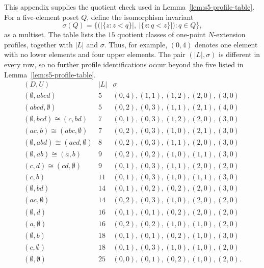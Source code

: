 This appendix supplies the quotient check used in
Lemma~\ref{lem:s5-profile-table}.  For a five-element poset $Q$, define
the isomorphism invariant
\[
        \sigma(Q)=
        \bigl\{\bigl(|\{z:z<q\}|,\ |\{z:q<z\}|\bigr):q\in Q\bigr\},
\]
as a multiset.  The table lists the $15$ quotient classes of one-point
$N$-extension profiles, together with $|L|$ and $\sigma$.  Thus, for
example, $(0,4)$ denotes one element with no lower elements and four upper
elements.  The pair
$(|L|,\sigma)$ is different in every row, so no further profile
identifications occur beyond the five listed in Lemma~\ref{lem:s5-profile-table}.
\[
\begin{array}{ccl}
(D,U) & |L| & \sigma\\
\hline
(\emptyset,abcd) & 5  & (0,4),(1,1),(1,2),(2,0),(3,0)\\
(abcd,\emptyset) & 5  & (0,2),(0,3),(1,1),(2,1),(4,0)\\
(\emptyset,bcd)\cong(c,bd) & 7 & (0,1),(0,3),(1,2),(2,0),(3,0)\\
(ac,b)\cong(abc,\emptyset) & 7 & (0,2),(0,3),(1,0),(2,1),(3,0)\\
(\emptyset,abd)\cong(acd,\emptyset) & 8 & (0,2),(0,3),(1,1),(2,0),(3,0)\\
(\emptyset,ab)\cong(a,b) & 9 & (0,2),(0,2),(1,0),(1,1),(3,0)\\
(c,d)\cong(cd,\emptyset) & 9 & (0,1),(0,3),(1,1),(2,0),(2,0)\\
(c,b) & 11 & (0,1),(0,3),(1,0),(1,1),(3,0)\\
(\emptyset,bd) & 14 & (0,1),(0,2),(0,2),(2,0),(3,0)\\
(ac,\emptyset) & 14 & (0,2),(0,3),(1,0),(2,0),(2,0)\\
(\emptyset,d) & 16 & (0,1),(0,1),(0,2),(2,0),(2,0)\\
(a,\emptyset) & 16 & (0,2),(0,2),(1,0),(1,0),(2,0)\\
(\emptyset,b) & 18 & (0,1),(0,1),(0,2),(1,0),(3,0)\\
(c,\emptyset) & 18 & (0,1),(0,3),(1,0),(1,0),(2,0)\\
(\emptyset,\emptyset) & 25 & (0,0),(0,1),(0,2),(1,0),(2,0).
\end{array}
\]
